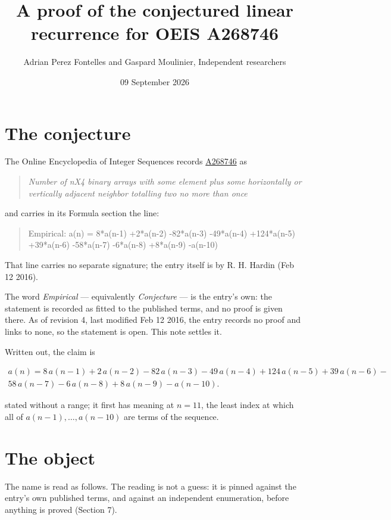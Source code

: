\documentclass[11pt]{article}
\title{A proof of the conjectured linear recurrence for OEIS A268746}
\author{Adrian Perez Fontelles and Gaspard Moulinier, Independent researchers}
\date{09 September 2026}
\theoremstyle{definition}
\begin{document}
\maketitle
\section{The conjecture}

The Online Encyclopedia of Integer Sequences records \href{https://oeis.org/A268746}{A268746} as

\begin{quote}\itshape Number of nX4 binary arrays with some element plus some horizontally or vertically adjacent neighbor totalling two no more than once\end{quote}

and carries in its Formula section the line:

\begin{quote}\ttfamily Empirical: a(n) = 8*a(n-1) +2*a(n-2) -82*a(n-3) -49*a(n-4) +124*a(n-5) +39*a(n-6) -58*a(n-7) -6*a(n-8) +8*a(n-9) -a(n-10)\end{quote}

That line carries no separate signature; the entry itself is by R. H. Hardin (Feb 12 2016).

The word {\itshape Empirical} --- equivalently {\itshape Conjecture} --- is the entry's own: the statement is recorded as fitted to the published terms, and no proof is given there. As of revision 4, last modified Feb 12 2016, the entry records no proof and links to none, so the statement is open. This note settles it.

Written out, the claim is

\begin{multline*} a(n) = 8\,a(n-1) + 2\,a(n-2) - 82\,a(n-3) - 49\,a(n-4) + 124\,a(n-5) + 39\,a(n-6) - \\ 58\,a(n-7) - 6\,a(n-8) + 8\,a(n-9) - a(n-10). \end{multline*}

stated without a range; it first has meaning at $n = 11$, the least index at which all of $a(n-1),\dots,a(n-10)$ are terms of the sequence.

\section{The object}

The name is read as follows. The reading is not a guess: it is pinned against the entry's own published terms, and against an independent enumeration, before anything is proved (Section 7).
\end{document}
